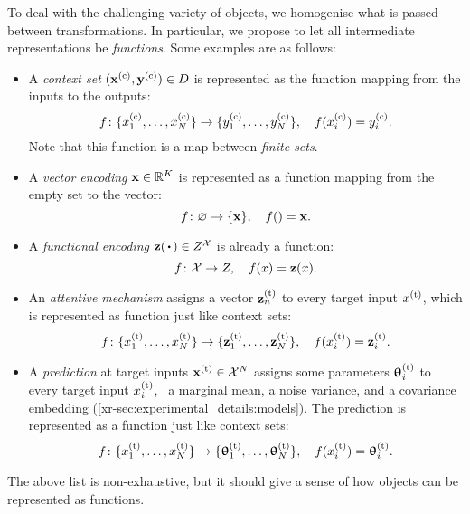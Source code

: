 \documentclass[12pt, twoside]{report}
\newcommand{\xrprefix}[1]{xr-#1}
\begin{document}
To deal with the challenging variety of objects,
we homogenise what is passed between transformations.
In particular, we propose to let all intermediate representations be \emph{functions}.
Some examples are as follows:
\begin{itemize}
    \item 
        A \emph{context set} $(\vx\us{(c)}, \vy\us{(c)}) \in D$ is represented as the function mapping from the inputs to the outputs:
        \begin{equation}
            f\colon\set{x\us{(c)}_1, \ldots, x\us{(c)}_N} \to \set{y\us{(c)}_1, \ldots, y\us{(c)}_N},
            \quad f(x\us{(c)}_i) = y\us{(c)}_i.
        \end{equation}
        Note that this function is a map between \emph{finite sets}.
    \item 
        A \emph{vector encoding} $\mathbf{x} \in \mathbb{R}^K$ is represented as a function mapping from the empty set to the vector:
        \begin{equation}
            f\colon \varnothing \to \{\mathbf{x}\},
            \quad
            f() = \mathbf{x}.
        \end{equation}
    \item 
        A \emph{functional encoding} $\vz(\vardot) \in Z^\X$ is already a function:
        \begin{equation}
            f\colon \mathcal{X} \to Z,
            \quad
            f(x) = \mathbf{z}(x).
        \end{equation}
    \item 
        An \emph{attentive mechanism} assigns a vector $\vz_n\us{(t)}$ to every target input $x\us{(t)}$, which is represented as function just like context sets:
        \begin{equation}
            f\colon\set{x\us{(t)}_1, \ldots, x\us{(t)}_N} \to \set{\vz\us{(t)}_1, \ldots, \vz\us{(t)}_N},
            \quad f(x\us{(t)}_i) = \vz\us{(t)}_i.
        \end{equation}
    \item   
        A \emph{prediction} at target inputs $\vx\us{(t)} \in \X^N$ assigns some parameters $\vtheta\us{(t)}_i$ to every target input $x\us{(t)}_i$, \eg~a marginal mean, a noise variance, and a covariance embedding (\cref{\xrprefix{sec:experimental_details:models}}).
        The prediction is represented as a function just like context sets:
        \begin{equation}
            f\colon\set{x\us{(t)}_1, \ldots, x\us{(t)}_N} \to \set{\vtheta\us{(t)}_1, \ldots, \vtheta\us{(t)}_N},
            \quad f(x\us{(t)}_i) = \vtheta\us{(t)}_i.
        \end{equation}
\end{itemize}
The above list is non-exhaustive, but it should give a sense of how objects can be represented as functions.
\end{document}
